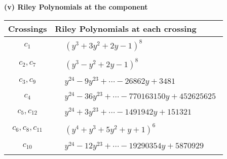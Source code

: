 \documentclass[1p]{elsarticle_modified}
\theoremstyle{definition}
\begin{document}
\newpage\renewcommand{\arraystretch}{1}
\flushleft \textbf{(v) Riley Polynomials at the component}\newline \\
\begin{tabular}{m{50pt}|m{274pt}}
Crossings & \hspace{64pt}Riley Polynomials at each crossing \\
\hline $$\begin{aligned}c_{1}\end{aligned}$$&$\begin{aligned}
&(y^3+3 y^2+2 y-1)^8
\end{aligned}$\\
\hline $$\begin{aligned}c_{2},c_{7}\end{aligned}$$&$\begin{aligned}
&(y^3- y^2+2 y-1)^8
\end{aligned}$\\
\hline $$\begin{aligned}c_{3},c_{9}\end{aligned}$$&$\begin{aligned}
&y^{24}-9 y^{23}+\cdots-26862 y+3481
\end{aligned}$\\
\hline $$\begin{aligned}c_{4}\end{aligned}$$&$\begin{aligned}
&y^{24}-36 y^{23}+\cdots-770163150 y+452625625
\end{aligned}$\\
\hline $$\begin{aligned}c_{5},c_{12}\end{aligned}$$&$\begin{aligned}
&y^{24}+3 y^{23}+\cdots-1491942 y+151321
\end{aligned}$\\
\hline $$\begin{aligned}c_{6},c_{8},c_{11}\end{aligned}$$&$\begin{aligned}
&(y^4+y^3+5 y^2+y+1)^6
\end{aligned}$\\
\hline $$\begin{aligned}c_{10}\end{aligned}$$&$\begin{aligned}
&y^{24}-12 y^{23}+\cdots-19290354 y+5870929
\end{aligned}$\\
\hline
\end{tabular}\\~\\
\end{document}
